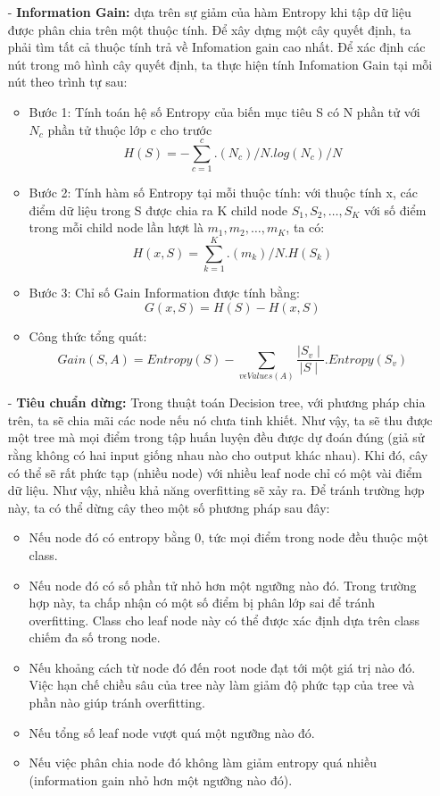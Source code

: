 \documentclass{report}
\begin{document}
\begin{enumerate}
        \item [- ] \textbf{Information Gain: } dựa trên sự giảm của hàm Entropy khi tập dữ liệu được phân chia trên một thuộc tính. Để xây dựng một cây quyết định, ta phải tìm tất cả thuộc tính trả về Infomation gain cao nhất. Để xác định các nút trong mô hình cây quyết định, ta thực hiện tính Infomation Gain tại mỗi nút theo trình tự sau:
        \begin{itemize}
            \item Bước 1: Tính toán hệ số Entropy của biến mục tiêu S có N phần tử với $N_c$ phần tử thuộc lớp c cho trước 
            $$ H(S) = - \sum_{c=1}^c.(N_c)/N.log(N_c)/N $$
            \item Bước 2: Tính hàm số Entropy tại mỗi thuộc tính: với thuộc tính x, các điểm dữ liệu trong S được chia ra K child node $S_1, S_2, …, S_K $ với số điểm trong mỗi child node lần lượt là $m_1,m_2,…, m_K$, ta có:
            $$H(x,S) = \sum_{k=1}^K.(m_k)/N.H(S_k) $$
            \item Bước 3: Chỉ số Gain Information được tính bằng:
            $$G(x,S) = H(S) - H(x,S)$$
            \item Công thức tổng quát:
            $$Gain(S,A) = Entropy(S) - \sum_{v \epsilon Values (A)} \frac{{\mid S_v \mid}}{{\mid S \mid}}.Entropy(S_v) $$
        \end{itemize}
        \item [- ] \textbf{Tiêu chuẩn dừng: }Trong thuật toán Decision tree, với phương pháp chia trên, ta sẽ chia mãi các node nếu nó chưa tinh khiết. Như vậy, ta sẽ thu được một tree mà mọi điểm trong tập huấn luyện đều được dự đoán đúng (giả sử rằng không có hai input giống nhau nào cho output khác nhau). Khi đó, cây có thể sẽ rất phức tạp (nhiều node) với nhiều leaf node chỉ có một vài điểm dữ liệu. Như vậy, nhiều khả năng overfitting sẽ xảy ra. Để tránh trường hợp này, ta có thể dừng cây theo một số phương pháp sau đây:
        \begin{itemize}
            \item Nếu node đó có entropy bằng 0, tức mọi điểm trong node đều thuộc một class.
            \item Nếu node đó có số phần tử nhỏ hơn một ngưỡng nào đó. Trong trường hợp này, ta chấp nhận có một số điểm bị phân lớp sai để tránh overfitting. Class cho leaf node này có thể được xác định dựa trên class chiếm đa số trong node.
            \item Nếu khoảng cách từ node đó đến root node đạt tới một giá trị nào đó. Việc hạn chế chiều sâu của tree này làm giảm độ phức tạp của tree và phần nào giúp tránh overfitting.
            \item Nếu tổng số leaf node vượt quá một ngưỡng nào đó.
            \item Nếu việc phân chia node đó không làm giảm entropy quá nhiều (information gain nhỏ hơn một ngưỡng nào đó).
        \end{itemize}
    \end{enumerate}
\end{document}
